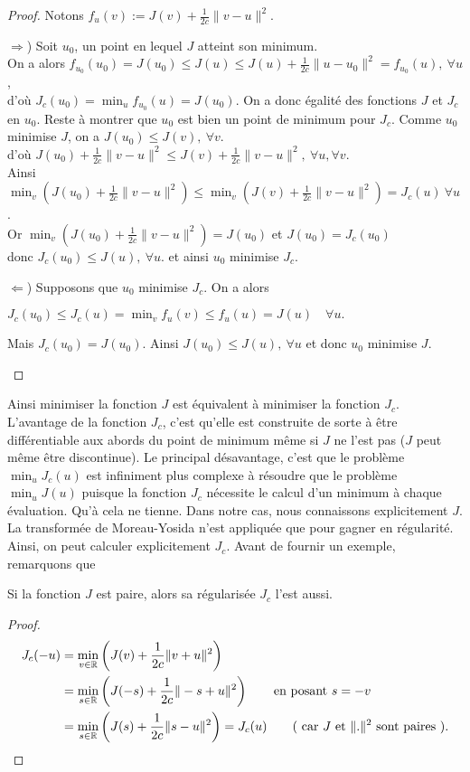 \documentclass[main.tex]{subfiles}
\begin{document}
\begin{proof}Notons $f_u(v) := J(v) + \frac{1}{2c} \| v-u \|^2$.
\begin{myitemize}
\item[$\Rightarrow$)] Soit $u_0$, un point en lequel $J$ atteint son minimum. \\
On a alors $f_{u_0}(u_0) = J(u_0)\leq J(u) \leq J(u) + \frac{1}{2c} \| u-u_0 \|^2  = f_{u_0}(u), \ \forall u $, \\
d'où $J_c(u_0) = \min_u f_{u_0}(u) = J(u_0) $. On a donc égalité des fonctions $J$ et $J_c$ en $u_0$. Reste à montrer que $u_0$ est bien un point de minimum pour $J_c$. Comme $u_0$ minimise $J$, on a $J(u_0)\leq J(v), \ \forall v$. \\
d'où $ J(u_0) + \frac{1}{2c}\|v-u\|^2 \leq J(v) + \frac{1}{2c}\| v-u \|^2, \ \forall u, \forall v$.\\
Ainsi $ \min_v ( J(u_0) + \frac{1}{2c}\|v-u\|^2 ) \leq \min_v ( J(v) + \frac{1}{2c}\| v-u \|^2)=J_c(u) \ \forall u$. \\
Or $\min_v ( J(u_0) + \frac{1}{2c}\|v-u\|^2 )=J(u_0)$ et $J(u_0)=J_c(u_0)$\\ donc $J_c(u_0) \leq J(u), \ \forall u $.
et ainsi $u_0$ minimise $J_c$.
\item[$\Leftarrow$)] Supposons que $u_0$ minimise $J_c$. On a alors
\begin{center}
$J_c(u_0) \leq J_c(u) = \min_v f_u(v) \leq f_u(u) = J(u) \quad \forall u.$
\end{center}
Mais $J_c(u_0) = J(u_0)$. Ainsi $J(u_0) \leq J(u), \ \forall u$ 
et donc $u_0$ minimise $J$.
\end{myitemize}
\end{proof}
Ainsi minimiser la fonction $J$ est équivalent à minimiser la fonction $J_c$. 
L'avantage de la fonction $J_c$, c'est qu'elle est construite de sorte à être  différentiable aux abords du point de minimum même si $J$ ne l'est pas ($J$ peut même être discontinue). Le principal désavantage, c'est que le problème $\min_u J_c(u)$ est infiniment plus complexe à résoudre que le problème $\min_u J(u)$ puisque la fonction $J_c$ nécessite le calcul d'un minimum à chaque évaluation. Qu'à cela ne tienne. Dans notre cas, nous connaissons explicitement $J$. La transformée de Moreau-Yosida n'est appliquée que pour gagner en régularité. Ainsi, on peut calculer explicitement $J_c$. Avant de fournir un exemple, remarquons que 
\begin{prop}
Si la fonction $J$ est paire, alors sa régularisée $J_c$ l'est aussi.
\end{prop}
\begin{proof}
\begin{align*}
J_c(-u)  & = \min_{v\in \mathbb{R}} \left( J(v) + \frac{1}{2c} \| v+u \|^2 \right) \\
& =\min_{s\in \mathbb{R}} \left( J(-s) + \frac{1}{2c} \| -s+u \|^2 \right) \qquad \textrm{en posant } s=-v \\
& = \min_{s\in \mathbb{R}} \left( J(s) + \frac{1}{2c} \|s-u \|^2 \right) = J_c(u) \qquad \textrm{( car $J$ et $\|.\|^2$ sont paires )}.
\end{align*}
\end{proof}
\end{document}

